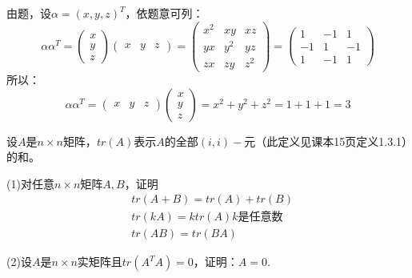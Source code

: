 \documentclass[a4paper]{report}
\begin{document}
\begin{jie}
由题，设$\alpha=(x,y,z)^T$，依题意可列：
\begin{equation*}
\alpha\alpha^T=
\begin{pmatrix}
x\\ y\\z
\end{pmatrix}\begin{pmatrix}
x& y&z
\end{pmatrix}=\begin{pmatrix}
x^2 & xy & xz\\
yx & y^2 & yz\\
zx & zy & z^2
\end{pmatrix}=\begin{pmatrix}
1&-1&1\\
-1&1&-1\\
1&-1&1
\end{pmatrix}
\end{equation*}
所以：
\begin{equation*}
\alpha\alpha^T=\begin{pmatrix}
x& y&z
\end{pmatrix}\begin{pmatrix}
x\\ y\\z
\end{pmatrix}=x^2+y^2+z^2=1+1+1=3
\end{equation*}
\end{jie}

\EX 设$A$是$n\times n$矩阵，$tr(A)$表示$A$的全部$(i,i)-$元（此定义见课本15页定义1.3.1）的和。

(1)对任意$n\times n$矩阵$A,B$，证明
\begin{align*}
&tr(A+B)=tr(A)+tr(B)\\
&tr(kA)=k tr(A)\text{$k$是任意数}\\
&tr(AB)=tr(BA)
\end{align*}

(2)设$A$是$n\times n$实矩阵且$tr(A^TA)=0$，证明：$A=0$.
\end{document}
